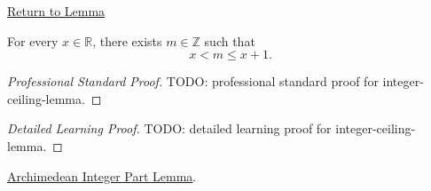 \newpage
{}
\label{prf:integer-ceiling-lemma}

\begin{remark*}[Return]
\hyperref[lem:integer-ceiling-lemma]{Return to Lemma}
\end{remark*}

\begin{lemma*}
For every $x\in\mathbb{R}$, there exists $m\in\mathbb{Z}$ such that
\[
x<m\le x+1.
\]
\end{lemma*}

\begin{proof}[Professional Standard Proof]
\LRAProofBodyStart
TODO: professional standard proof for integer-ceiling-lemma.
\end{proof}

\begin{proof}[Detailed Learning Proof]
\LRAProofBodyStart
TODO: detailed learning proof for integer-ceiling-lemma.
\end{proof}

\begin{remark*}
\end{remark*}

\begin{dependencies}
\hyperref[lem:archimedean-integer-part-lemma]{Archimedean Integer Part Lemma}.
\end{dependencies}

\clearpage
